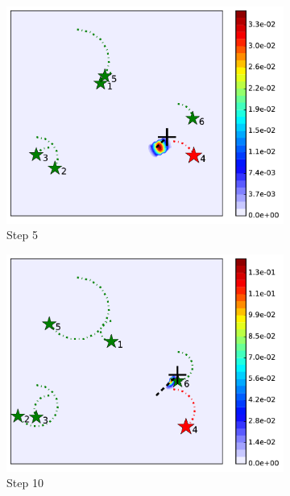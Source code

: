 \documentclass[journal]{IEEEtranTIE}
\theoremstyle{remark}
\begin{document}
\begin{figure}
\begin{subfigure}[b]{0.21\textwidth}
			\includegraphics[width=\textwidth]{hetero_mov_sen_mov_tar_rbt4_step5_16-TIE-3798}
			\caption{Step 5}\label{fig:htr_mov_sen_mov_tar_sing3}
		\end{subfigure}
		\begin{subfigure}[b]{0.21\textwidth}
			\includegraphics[width=\textwidth]{hetero_mov_sen_mov_tar_rbt4_step10_16-TIE-3798}
			\caption{Step 10}\label{fig:htr_mov_sen_mov_tar_sing4}
		\end{subfigure}
		\begin{subfigure}[b]{0.21\textwidth}

\end{subfigure}
\end{figure}
\end{document}
